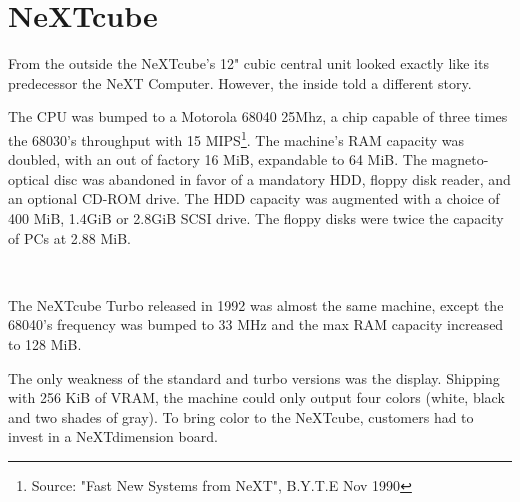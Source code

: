 
\section{NeXTcube}
From the outside the NeXTcube's 12" cubic central unit looked exactly like its predecessor the NeXT Computer. However, the inside told a different story.\\
\par
 The CPU was bumped to a Motorola 68040 25Mhz, a chip capable of three times the 68030's throughput with 15 MIPS\footnote{Source: "Fast New Systems from NeXT", B.Y.T.E Nov 1990}. The machine's RAM capacity was doubled, with an out of factory 16 MiB, expandable to 64 MiB. The magneto-optical disc was abandoned in favor of a mandatory HDD, floppy disk reader, and an optional CD-ROM drive. The HDD capacity was augmented with a choice of 400 MiB, 1.4GiB or 2.8GiB SCSI drive. The floppy disks were twice the capacity of PCs at 2.88 MiB.\\
\par
\begin{minipage}{\textwidth}
 \\
\end{minipage}

\par
The NeXTcube Turbo released in 1992 was almost the same machine, except the 68040's frequency was bumped to 33 MHz and the max RAM capacity increased to 128 MiB.\\
\par
The only weakness of the standard and turbo versions was the display. Shipping with 256 KiB of VRAM, the machine could only output four colors (white, black and two shades of gray). To bring color to the NeXTcube, customers had to invest in a NeXTdimension board.\\
\par

\pagebreak


